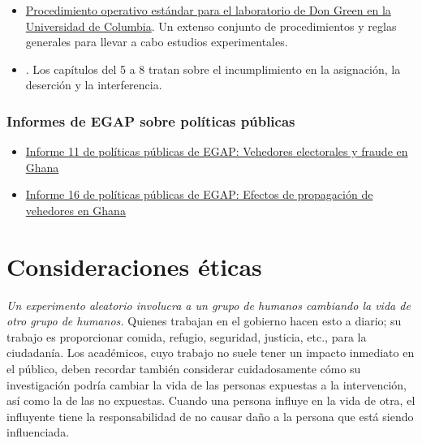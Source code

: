 \documentclass[
  12pt,
  spanish,
]{book}
\providecommand{\tightlist}{%
  \setlength{\itemsep}{0pt}\setlength{\parskip}{0pt}}
\begin{document}
\begin{itemize}
\tightlist
\item
  \href{https://github.com/acoppock/Green-Lab-SOP}{Procedimiento operativo estándar para el laboratorio de Don Green en la Universidad de Columbia}. Un extenso conjunto de procedimientos y reglas generales para llevar a cabo estudios experimentales.
\item
  \autocite{gerber_field_2012}. Los capítulos del 5 a 8 tratan sobre el incumplimiento en la asignación, la deserción y la interferencia.
\end{itemize}

\hypertarget{informes-de-egap-sobre-poluxedticas-puxfablicas-3}{%
\subsection{Informes de EGAP sobre políticas públicas}\label{informes-de-egap-sobre-poluxedticas-puxfablicas-3}}

\begin{itemize}
\item
  \href{https://egap.org/resource/brief-11-election-observers-and-fraud-in-ghana/}{Informe 11 de políticas públicas de EGAP: Vehedores electorales y fraude en Ghana}
\item
  \href{https://egap.org/resource/brief-16-spillover-effects-of-observers-in-ghana/}{Informe 16 de políticas públicas de EGAP: Efectos de propagación de vehedores en Ghana}
\end{itemize}

\hypertarget{consideraciones-uxe9ticas}{%
\chapter{Consideraciones éticas}\label{consideraciones-uxe9ticas}}

\emph{Un experimento aleatorio involucra a un grupo de humanos cambiando la vida de otro grupo de humanos.} Quienes trabajan en el gobierno hacen esto a diario; su trabajo es proporcionar comida, refugio, seguridad, justicia, etc., para la ciudadanía. Los académicos, cuyo trabajo no suele tener un impacto inmediato en el público, deben recordar también considerar cuidadosamente cómo su investigación podría cambiar la vida de las personas expuestas a la intervención, así como la de las no expuestas. Cuando una persona influye en la vida de otra, el influyente tiene la responsabilidad de no causar daño a la persona que está siendo influenciada.
\end{document}
